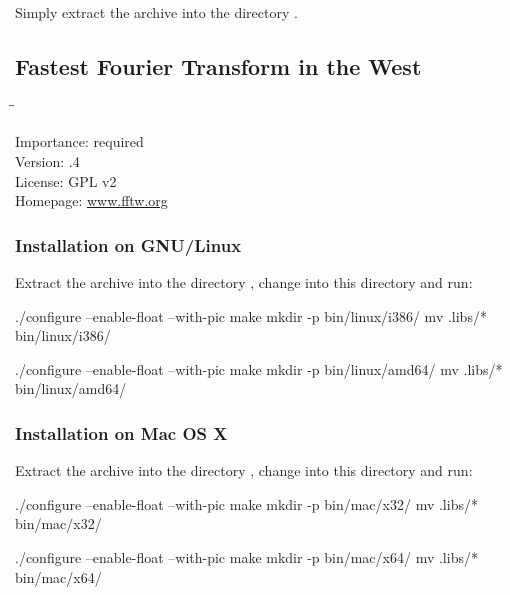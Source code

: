 Simply extract the archive into the directory
.

\subsection{Fastest Fourier Transform in the West}

\begin{tabbing}
  \hspace*{6em}\=\=\kill

  Importance:  \> required \\
  Version:     .4 \\
  License:     \> GPL v2 \\
  Homepage:    \> \href{http://www.fftw.org/}{www.fftw.org}
\end{tabbing}

\subsubsection{Installation on GNU/Linux}

Extract the archive into the directory , change
into this directory and run:

\begin{Verbatim32}
  ./configure --enable-float --with-pic
  make
  mkdir -p bin/linux/i386/
  mv .libs/* bin/linux/i386/
\end{Verbatim32}

\begin{Verbatim64}
  ./configure --enable-float --with-pic
  make
  mkdir -p bin/linux/amd64/
  mv .libs/* bin/linux/amd64/
\end{Verbatim64}

\subsubsection{Installation on Mac OS X}

Extract the archive into the directory , change
into this directory and run:

\begin{Verbatim32}
  ./configure --enable-float --with-pic
  make
  mkdir -p bin/mac/x32/
  mv .libs/* bin/mac/x32/
\end{Verbatim32}

\begin{Verbatim64}
  ./configure --enable-float --with-pic
  make
  mkdir -p bin/mac/x64/
  mv .libs/* bin/mac/x64/
\end{Verbatim64}

